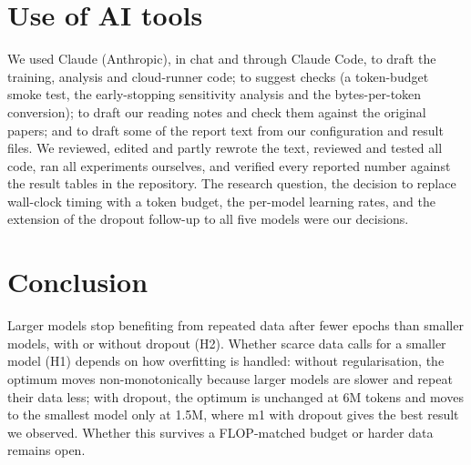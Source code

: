 \documentclass[11pt]{article}
\begin{document}
\section{Use of AI tools}
We used Claude (Anthropic), in chat and through Claude Code, to draft the training, analysis and cloud-runner
code; to suggest checks (a token-budget smoke test, the early-stopping sensitivity analysis and the
bytes-per-token conversion); to draft our reading notes and check them against the original papers; and to
draft some of the report text from our configuration and result files. We reviewed, edited and partly rewrote the text, 
reviewed and tested all code, ran all experiments ourselves, and verified every reported number against the result tables in the repository. 
The research question, the decision to replace wall-clock timing with a token budget, the per-model learning rates, 
and the extension of the dropout follow-up to all five models were our decisions.

\section{Conclusion}
Larger models stop benefiting from repeated data after fewer epochs than smaller models, with or without dropout (H2). Whether
scarce data calls for a smaller model (H1) depends on how overfitting is handled: without regularisation, the
optimum moves non-monotonically because larger models are slower and repeat their data less; with dropout,
the optimum is unchanged at 6M tokens and moves to the smallest model only at 1.5M, where m1 with dropout gives
the best result we observed. Whether this survives a FLOP-matched budget or harder data remains open.

\setlength{\bibsep}{2pt}
{\footnotesize


}
\end{document}
